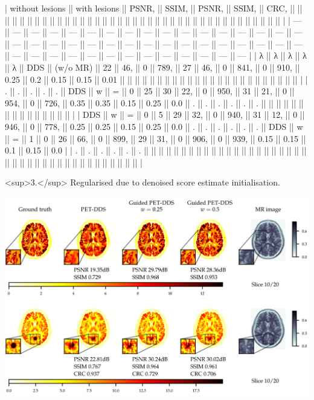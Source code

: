 \documentclass{article}
\begin{document}
| without lesions || with lesions || PSNR, || SSIM, || PSNR, || SSIM, || CRC,     ||     ||      ||     ||      ||     ||      ||      ||      ||      ||      ||      ||      ||      ||      ||      ||      ||      ||     ||     ||     ||     ||     ||     ||     ||     ||     ||     ||      ||     ||     ||     ||      ||     ||      ||      ||      ||     ||      ||     |
| ---             || ---          || ---   || ---   || ---   || ---   || ---      || --- || ---  || --- || ---  || --- || ---  || ---  || ---  || ---  || ---  || ---  || ---  || ---  || ---  || ---  || ---  || ---  || --- || --- || --- || --- || --- || --- || --- || --- || --- || --- || ---  || --- || --- || --- || ---  || --- || ---  || ---  || ---  || --- || ---  || --- |
| λ               || λ            || λ     || λ     || λ     || DDS   || (w/o MR) || 22  || 46,  || 0   || 789, || 27  || 46,  || 0    || 841, || 0    || 910, || 0.25 || 0.2  || 0.15 || 0.15 || 0.01 ||      ||      ||     ||     ||     ||     ||     ||     ||     ||     ||     ||     ||      ||     ||     ||     ||      ||     ||      ||      ||      ||     ||      ||     |
| .               || .            || .     || .     || .     || DDS   || w        || =   || 0    || 25  || 30   || 22, || 0    || 950, || 31   || 21,  || 0    || 954, || 0    || 726, || 0.35 || 0.35 || 0.15 || 0.25 || 0.0 || .   || .   || .   || .   || .   || .   ||     ||     ||     ||      ||     ||     ||     ||      ||     ||      ||      ||      ||     ||      ||     |
| DDS             || w            || =     || 0     || 5     || 29    || 32,      || 0   || 940, || 31  || 12,  || 0   || 946, || 0    || 778, || 0.25 || 0.25 || 0.15 || 0.25 || 0.0  || .    || .    || .    || .    || .   || .   || DDS || w   || =   || 1   || 0   || 26  || 66, || 0   || 899, || 29  || 31, || 0   || 906, || 0   || 939, || 0.15 || 0.15 || 0.1 || 0.15 || 0.0 |
| .               || .            || .     || .     || .     || .     ||          ||     ||      ||     ||      ||     ||      ||      ||      ||      ||      ||      ||      ||      ||      ||      ||      ||      ||     ||     ||     ||     ||     ||     ||     ||     ||     ||     ||      ||     ||     ||     ||      ||     ||      ||      ||      ||     ||      ||     |

<sup>3.</sup> Regularised due to denoised score estimate initialisation.


\includegraphics{_page_17_Figure_1.png}
\end{document}
